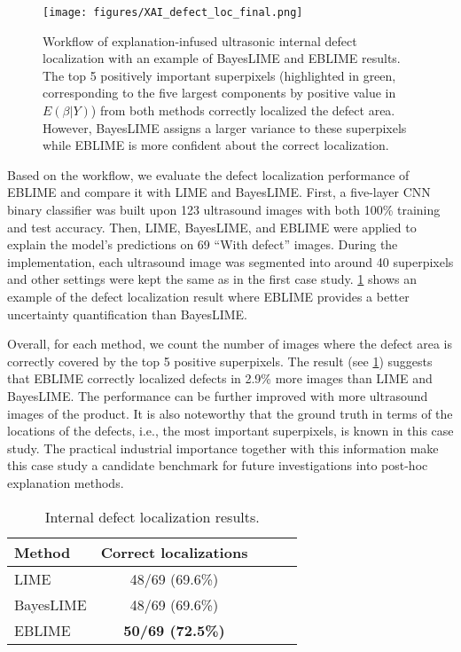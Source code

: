 \documentclass{article}
\theoremstyle{plain}
\theoremstyle{definition}
\theoremstyle{remark}
\begin{document}
\begin{figure}[ht]
\begin{center}
\centerline{\texttt{[image: figures/XAI\_defect\_loc\_final.png]}}
\caption{Workflow of explanation-infused ultrasonic internal defect localization with an example of BayesLIME and EBLIME results. The top 5 positively important superpixels (highlighted in green, corresponding to the five largest components by positive value in $E(\beta|Y)$) from both methods correctly localized the defect area. However, BayesLIME assigns a larger variance to these superpixels while EBLIME is more confident about the correct localization.}
\label{XAI_def_loc}
\end{center}
\end{figure}

Based on the workflow, we evaluate the defect localization performance of EBLIME and compare it with LIME and BayesLIME. First, a five-layer CNN binary classifier was built upon 123 ultrasound images with both 100\% training and test accuracy. Then, LIME, BayesLIME, and EBLIME were applied to explain the model's predictions on 69 ``With defect'' images. During the implementation, each ultrasound image was segmented into around 40 superpixels and other settings were kept the same as in the first case study. \cref{XAI_def_loc} shows an example of the defect localization result where EBLIME provides a better uncertainty quantification than BayesLIME. 

Overall, for each method, we count the number of images where the defect area is correctly covered by the top 5 positive superpixels. The result (see \cref{table1}) suggests that EBLIME correctly localized defects in 2.9\% more images than LIME and BayesLIME. The performance can be further improved with more ultrasound images of the product. It is also noteworthy that the ground truth in terms of the locations of the defects, i.e., the most important superpixels, is known in this case study. The practical industrial importance together with this information make this case study a candidate benchmark for future investigations into post-hoc explanation methods. 

\begin{table}[hbt]
\caption{Internal defect localization results.}
\label{table1}
\vskip 0.1in
\begin{center}
\begin{small}
\begin{sc}
\begin{tabular}{lcccr}
\toprule
Method & Correct localizations \\ 
\midrule
LIME            & 48/69 (69.6\%)                 \\
BayesLIME       & 48/69 (69.6\%)                 \\
EBLIME          & \textbf{50/69 (72.5\%)}                 \\ 
\bottomrule
\end{tabular}
\end{sc}
\end{small}
\end{center}
\vskip -0.1in
\end{table}
\end{document}
